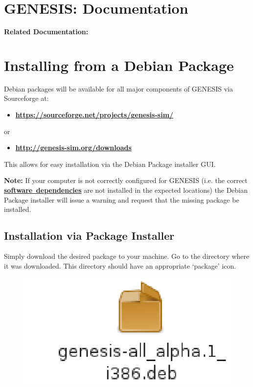\documentclass[12pt]{article}
\begin{document}
\section*{GENESIS: Documentation}

{\bf Related Documentation:}

\section*{Installing from a Debian Package}

Debian packages will be available for all major components of GENESIS via Sourceforge at:
\begin{itemize}
   \item[]\href{https://sourceforge.net/projects/genesis-sim/}{\bf https://sourceforge.net/projects/genesis-sim/}
\end{itemize}
\noindent or
\begin{itemize}
   \item[]\href{http://genesis-sim.org/downloads}{\bf http://genesis-sim.org/downloads}
\end{itemize}
This allows for easy installation via the Debian Package installer GUI.

{\bf Note:} If your computer is not correctly configured for GENESIS (i.e. the correct \href{../genesis-dependencies/genesis-dependencies.tex}{\bf software
\,dependencies} are not installed in the expected locations) the Debian Package installer will issue a warning and request that the missing package be installed.

\subsection*{Installation via Package Installer}

Simply download the desired package to your machine. Go to the directory where it was downloaded. This directory should have an appropriate `package' icon.

\begin{figure}[h]
   \centering
   \includegraphics[scale=1]{figures/install-user-deb-icon.eps}
\end{figure}
\end{document}
